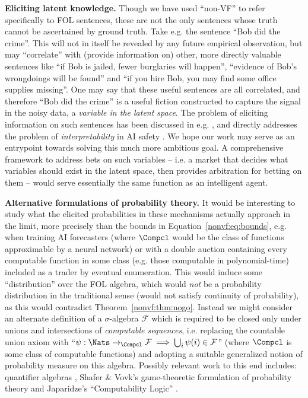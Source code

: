 \textbf{Eliciting latent knowledge.} Though we have used ``non-VF'' to refer specifically to FOL sentences, these are not the only sentences whose truth cannot be ascertained by ground truth. Take e.g. the sentence ``Bob did the crime''. This will not in itself be revealed by any future empirical observation, but may ``correlate'' with (provide information on) other, more directly valuable sentences like ``if Bob is jailed, fewer burglaries will happen'', ``evidence of Bob's wrongdoings will be found'' and ``if you hire Bob, you may find some office supplies missing''. One may say that these useful sentences are all correlated, and therefore ``Bob did the crime'' is a useful fiction constructed to capture the signal in the noisy data, a \emph{variable in the latent space}. The problem of eliciting information on such sentences has been discussed in e.g. \citet{tailcalledLatentVariablesPrediction2023, baillonBayesianMarketsElicit2017, baillonSimpleBetsElicit2021}, and directly addresses the problem of \emph{interpretability} in AI safety \citep{christianoElicitingLatentKnowledge2021}. We hope our work may serve as an entrypoint towards solving this much more ambitious goal. %
A comprehensive framework to address bets on such variables -- i.e. a market that decides what variables should exist in the latent space, then provides arbitration for betting on them -- would serve essentially the same function as an intelligent agent.

\textbf{Alternative formulations of probability theory.} It would be interesting to study what the elicited probabilities in these mechanisms actually approach in the limit, more precisely than the bounds in Equation~\ref{nonvf:eq:bounds}, e.g. when training AI forecasters (where $\Compcl$ would be the class of functions approximable by a neural network) or with a double auction containing every computable function in some class (e.g. those computable in polynomial-time) included as a trader by eventual enumeration. This would induce some ``distribution'' over the FOL algebra, which would \emph{not} be a probability distribution in the traditional sense (would not satisfy continuity of probability), as this would contradict Theorem~\ref{nonvf:thm:nogo}. Instead we might consider an alternate definition of a $\sigma$-algebra $\mathcal{F}$ which is required to be closed only under unions and intersections of \emph{computable sequences}, i.e. replacing the countable union axiom with ``$\psi:\Nats\to_{\Compcl}\mathcal{F}\implies\bigcup_i\psi(i)\in\mathcal{F}$'' (where $\Compcl$ is some class of computable functions) and adopting a suitable generalized notion of probability measure on this algebra. Possibly relevant work to this end includes: quantifier algebras \citep{cwooQuantifierAlgebra2013}, Shafer \& Vovk's game-theoretic formulation of probability theory \citep{shaferProbabilityFinanceIts2005, shaferGameTheoreticFoundationsProbability2019} and Japaridze's ``Computability Logic'' \citep{japaridzeBeginningWasGame2009, japaridzeSurveyComputabilityLogic2015}.

